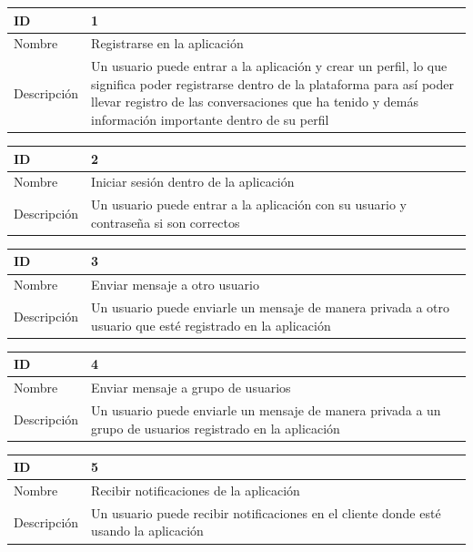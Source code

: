 \begin{center}
\begin{tabular}{|p{}|p{}|}
\hline
\textbf{ID} & 1\\ 
\hline
Nombre & Registrarse en la aplicación\\
\hline
Descripción & Un usuario puede entrar a la aplicación y crear un perfil, lo que significa poder registrarse dentro de la plataforma para así poder llevar registro de las conversaciones que ha tenido y demás información importante dentro de su perfil \\
\hline
\end{tabular}
\vspace{2mm}

\begin{tabular}{|p{}|p{}|}
\hline
\textbf{ID} & 2 \\ 
\hline
Nombre & Iniciar sesión dentro de la aplicación \\
\hline
Descripción & Un usuario puede entrar a la aplicación con su usuario y contraseña si son correctos\\ 
\hline
\end{tabular}
\vspace{2mm}

\begin{tabular}{|p{}|p{}|}
\hline
\textbf{ID} & 3\\
\hline
Nombre & Enviar mensaje a otro usuario\\ 
\hline
Descripción & Un usuario puede enviarle un mensaje de manera privada a otro usuario que esté registrado en la aplicación \\
\hline
\end{tabular}
\vspace{2mm}

\begin{tabular}{|p{}|p{}|}
\hline
\textbf{ID} & 4\\ 
\hline
Nombre & Enviar mensaje a grupo de usuarios\\ 
\hline
Descripción & Un usuario puede enviarle un mensaje de manera privada a un grupo de usuarios registrado en la aplicación\\
\hline
\end{tabular}
\vspace{2mm}

\begin{tabular}{|p{}|p{}|}
\hline
\textbf{ID} & 5\\
\hline
Nombre & Recibir notificaciones de la aplicación\\
\hline
Descripción & Un usuario puede recibir notificaciones en el cliente donde esté usando la aplicación \\ 
\hline
\end{tabular}
\vspace{2mm}


\end{center}
